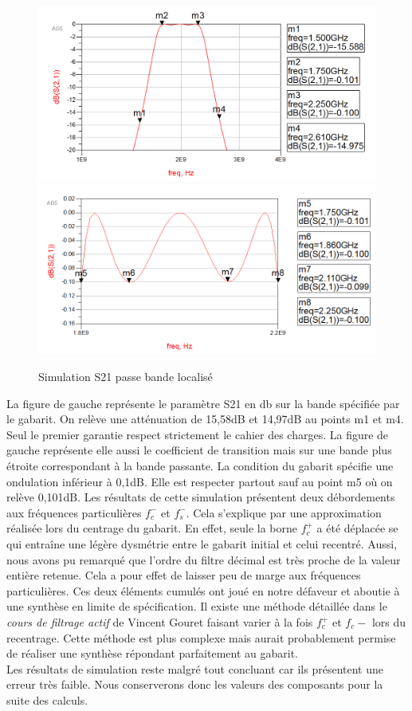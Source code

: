 \documentclass[french]{article}
\begin{document}
\begin{figure}[H]
	\centering
	\includegraphics[width=0.49\linewidth]{../4synthPBande/impedance/S21__passe_bande_localise}
	\includegraphics[width=0.49\linewidth]{../4synthPBande/impedance/S21__bande_passante_passe_bande_localise}
	\caption{Simulation S21 passe bande localisé}
	\label{fig:ads_S21_BP_localise1}
\end{figure}
La figure de gauche représente le paramètre S21 en db sur la bande spécifiée par le gabarit. On relève une atténuation de 15,58dB et 14,97dB au points m1 et m4. Seul le premier garantie respect strictement le cahier des charges. La figure de gauche représente elle aussi le coefficient de transition mais sur une bande plus étroite correspondant à la bande passante. La condition du gabarit spécifie une ondulation inférieur à 0,1dB. Elle est respecter partout sauf au point m5 où on relève 0,101dB. Les résultats de cette simulation présentent deux débordements aux fréquences particulières $f_c^-$ et $f_s^-$. Cela s'explique par une approximation réalisée lors du centrage du gabarit. En effet, seule la borne $f_c^+$ a été déplacée se qui entraîne une légère dysmétrie entre le gabarit initial et celui recentré. Aussi, nous avons pu remarqué que l'ordre du filtre décimal est très proche de la valeur entière retenue. Cela a pour effet de laisser peu de marge aux fréquences particulières. Ces deux éléments cumulés ont joué en notre défaveur et aboutie à une synthèse en limite de spécification. 
Il existe une méthode détaillée dans le \textit{cours de filtrage actif} de Vincent Gouret faisant varier à la fois $f_c^+$ et $f_c-$ lors du recentrage. Cette méthode est plus complexe mais aurait probablement permise de réaliser une synthèse répondant parfaitement au gabarit.\\
Les résultats de simulation reste malgré tout concluant car ils présentent une erreur très faible. Nous conserverons donc les valeurs des composants pour la suite des calculs.\\
\end{document}
